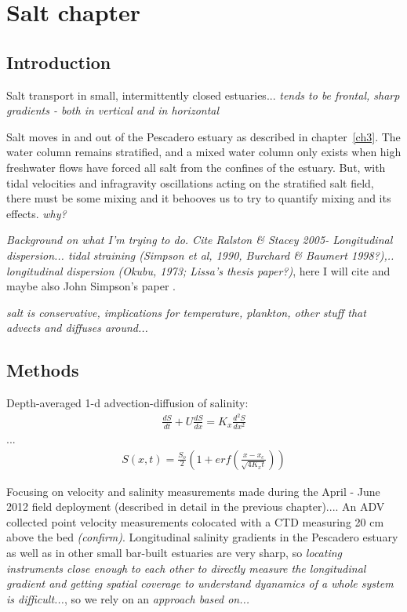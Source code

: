 \chapter{Salt chapter}
\label{chSalt}


\section{Introduction}
Salt transport in small, intermittently closed estuaries... \emph{tends to be frontal, sharp gradients - both in vertical and in horizontal}

Salt moves in and out of the Pescadero estuary as described in chapter~\ref{ch3}. The water column remains stratified, and a mixed water column only exists when high freshwater flows have forced all salt from the confines of the estuary. But, with tidal velocities and infragravity oscillations acting on the stratified salt field, there must be some mixing and it behooves us to try to quantify mixing and its effects. \emph{why?}



\emph{Background on what I'm trying to do.  Cite Ralston \& Stacey 2005- Longitudinal dispersion... tidal straining (Simpson et al, 1990, Burchard \& Baumert 1998?),.. longitudinal dispersion (Okubu, 1973; Lissa's thesis paper?)}, here I will cite \parencite{Ralston:2005aa} and maybe also John Simpson's paper \parencite{Simpson:1990aa}. 

\emph{salt is conservative, implications for temperature, plankton, other stuff that advects and diffuses around...}



\section{Methods}

Depth-averaged 1-d advection-diffusion of salinity:
\begin{eqnarray}
\frac{dS}{dt} + U\frac{dS}{dx} = K_x\frac{d^2S}{dx^2} \label{eq:1dadvdiff}
\end{eqnarray}
...
\begin{eqnarray}
S(x,t) = \frac{S_o}{2}(1+erf(\frac{x-x_c}{\sqrt{4K_xt}})) \label{eq:S}
\end{eqnarray}

Focusing on velocity and salinity measurements made during the April - June 2012 field deployment (described in detail in the previous chapter).... An ADV collected point velocity measurements colocated with a CTD measuring 20 cm above the bed \emph{(confirm)}. Longitudinal salinity gradients in the Pescadero estuary as well as in other small bar-built estuaries are very sharp, so \emph{locating instruments close enough to each other to directly measure the longitudinal gradient and getting spatial coverage to understand dyanamics of a whole system is difficult...}, so we rely on an \emph{approach based on...}


